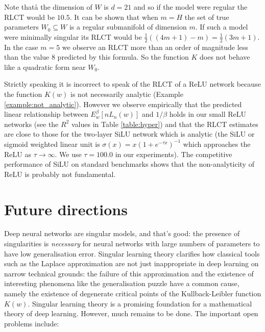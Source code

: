 \documentclass{article} %
\begin{document}
Note thatå the dimension of $W$ is $d = 21$ and so if the model were regular the RLCT would be $10.5$. It can be shown that when $m = H$ the set of true parameters $W_0 \subseteq W$ is a regular submanifold of dimension $m$. If such a model were minimally singular its RLCT would be $\tfrac{1}{2}( (4m + 1) - m ) = \tfrac{1}{2}( 3m + 1 )$. In the case $m = 5$ we observe an RLCT more than an order of magnitude less than the value $8$ predicted by this formula. So the function $K$ does not behave like a quadratic form near $W_0$.

Strictly speaking it is incorrect to speak of the RLCT of a ReLU network because the function $K(w)$ is not necessarily analytic (Example \ref{example:not_analytic}). However we observe empirically that the predicted linear relationship between $E^\beta_w[nL_n(w)]$ and $1/\beta$ holds in our small ReLU networks (see the $R^2$ values in Table \ref{table:hyper}) and that the RLCT estimates are close to those for the two-layer SiLU network \citep{hendrycks2016gaussian} which is analytic (the SiLU or sigmoid weighted linear unit is $\sigma(x) = x (1 + e^{-\tau x})^{-1}$ which approaches the ReLU as $\tau \to \infty$. We use $\tau = 100.0$ in our experiments). The competitive performance of SiLU on standard benchmarks \citep{ramachandran2017swish} shows that the non-analyticity of ReLU is probably not fundamental.


\section{Future directions}

Deep neural networks are singular models, and that's good: the presence of singularities is \emph{necessary} for neural networks with large numbers of parameters to have low generalisation error. Singular learning theory clarifies how classical tools such as the Laplace approximation are not just inappropriate in deep learning on narrow technical grounds: the failure of this approximation and the existence of interesting phenomena like the generalisation puzzle have a common cause, namely the existence of degenerate critical points of the Kullback-Leibler function $K(w)$. 
Singular learning theory is a promising foundation for a mathematical theory of deep learning. However, much remains to be done. The important open problems include:
\end{document}
